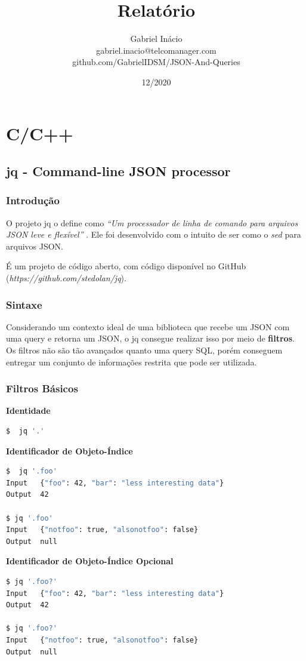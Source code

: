 \documentclass[a4paper, 12pt] {article}
\title{Relatório}
\author{Gabriel Inácio\\gabriel.inacio@telcomanager.com\\github.com/GabrielIDSM/JSON-And-Queries}
\date{12/2020}
\begin{document}
	\maketitle \newpage \tableofcontents \newpage
	\section{C/C++}
		\subsection{jq - Command-line JSON processor}
			\subsubsection{Introdução}
				O projeto jq o define como \textit{“Um processador de linha de comando para arquivos JSON leve e flexível” }. Ele foi desenvolvido com o intuito de ser como o \textit{sed} para arquivos JSON. 

				É um projeto de código aberto, com código disponível no GitHub (\textit{https://github.com/stedolan/jq}).
			\subsubsection{Sintaxe}
				Considerando um contexto ideal de uma biblioteca que recebe um JSON com uma query e retorna um JSON, o jq consegue realizar isso por meio de \textbf{filtros}. Os filtros não são tão avançados quanto uma query SQL, porém conseguem entregar um conjunto de informações restrita que pode ser utilizada.
			\subsubsection{Filtros Básicos}
				\textbf{Identidade}

\begin{lstlisting}[language=bash]
$  jq '.'
\end{lstlisting}

				\textbf{Identificador de Objeto-Índice}

\begin{lstlisting}[language=bash]
$  jq '.foo'
Input	{"foo": 42, "bar": "less interesting data"}
Output 	42

$ jq '.foo'
Input	{"notfoo": true, "alsonotfoo": false}
Output 	null
\end{lstlisting}

				\textbf{Identificador de Objeto-Índice Opcional}

\begin{lstlisting}[language=bash]
$ jq '.foo?'
Input	{"foo": 42, "bar": "less interesting data"}
Output 	42
	
$ jq '.foo?'
Input	{"notfoo": true, "alsonotfoo": false}
Output 	null

\end{lstlisting}
\end{document}
